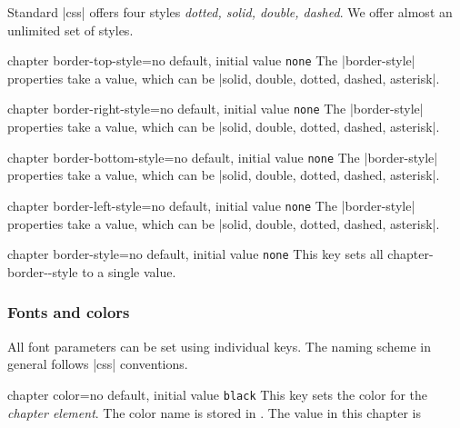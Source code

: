 \begin{decription}
Standard |css|  offers four styles \emph{dotted, solid, double, dashed}. We offer almost an unlimited set of styles.

\begin{docKey}[phd]{chapter border-top-style}{=}{no default, initial value \texttt{none}}
The |border-style| properties take a value, which can be |solid, double, dotted, dashed, asterisk|.
\end{docKey}

\begin{docKey}[phd]{chapter border-right-style}{=}{no default, initial value \texttt{none}}
The |border-style| properties take a value, which can be |solid, double, dotted, dashed, asterisk|.
\end{docKey}

\begin{docKey}[]{chapter border-bottom-style}{=}{no default, initial value \texttt{none}}
The |border-style| properties take a value, which can be |solid, double, dotted, dashed, asterisk|.
\end{docKey}

\begin{docKey}[]{chapter border-left-style}{=}{no default, initial value \texttt{none}}
The |border-style| properties take a value, which can be |solid, double, dotted, dashed, asterisk|.
\end{docKey}

\begin{docKey}[phd]{chapter border-style}{=}{no default, initial value \texttt{none}}
This key sets all chapter-border--style to a single value.
\end{docKey}

\subsubsection{Fonts and colors}

All font parameters can be set using individual keys. The naming scheme in general follows |css| conventions.

\begin{docKey}[phd]{chapter color}{=}{no default, initial value \texttt{black}}
This key sets the color for the \textit{chapter element}. The color name is stored in \cmd{\chaptercolor@cx}.
The value in this chapter is%
\end{docKey}


\end{decription}
